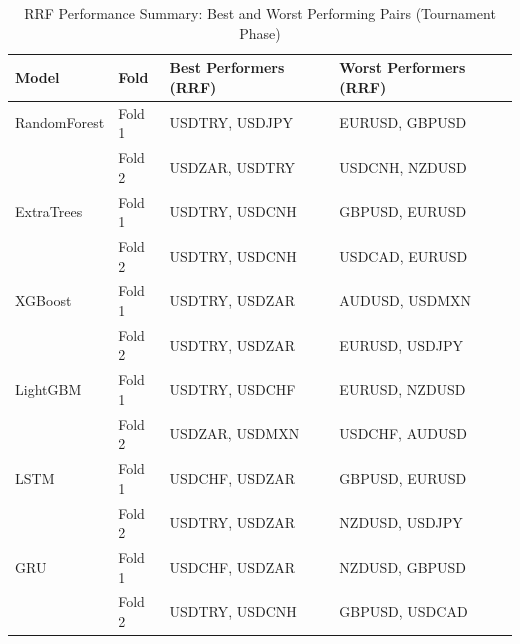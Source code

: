 \begin{table}[H] \centering \small
\caption{RRF Performance Summary: Best and Worst Performing Pairs (Tournament Phase)}
\label{tab:rrf_summary_tournament}
\begin{tabular}{l l p{5cm} p{5cm}}
\toprule
Model & Fold & Best Performers (RRF) & Worst Performers (RRF) \\
\midrule
RandomForest & Fold 1 & USDTRY, USDJPY & EURUSD, GBPUSD \\
 & Fold 2 & USDZAR, USDTRY & USDCNH, NZDUSD \\
ExtraTrees & Fold 1 & USDTRY, USDCNH & GBPUSD, EURUSD \\
 & Fold 2 & USDTRY, USDCNH & USDCAD, EURUSD \\
XGBoost & Fold 1 & USDTRY, USDZAR & AUDUSD, USDMXN \\
 & Fold 2 & USDTRY, USDZAR & EURUSD, USDJPY \\
LightGBM & Fold 1 & USDTRY, USDCHF & EURUSD, NZDUSD \\
 & Fold 2 & USDZAR, USDMXN & USDCHF, AUDUSD \\
LSTM & Fold 1 & USDCHF, USDZAR & GBPUSD, EURUSD \\
 & Fold 2 & USDTRY, USDZAR & NZDUSD, USDJPY \\
GRU & Fold 1 & USDCHF, USDZAR & NZDUSD, GBPUSD \\
 & Fold 2 & USDTRY, USDCNH & GBPUSD, USDCAD \\
\bottomrule
\end{tabular}
\end{table}
